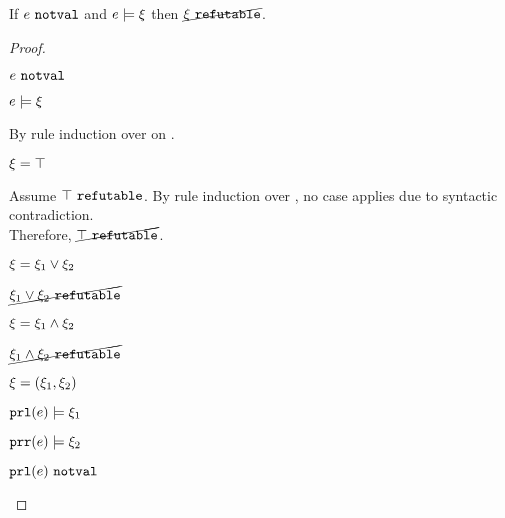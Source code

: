 \begin{lemma}
\label{lem:satisfy-not-refutable}
If $e ~\mathtt{notval}$ and $e \models \xi$ then $\cancel{\xi ~\mathtt{refutable}}$.
\end{lemma}
\begin{proof}
\begin{pfsteps*}
\item $e ~\mathtt{notval}$  
\item $e \models \xi$  
\end{pfsteps*}
By rule induction over  on .
\begin{byCases}
\item[\text{(\ref{rule:CSTruth})}]
    \begin{pfsteps*}
    \item $\xi=\top$ 
    \end{pfsteps*}
    Assume $\top ~\mathtt{refutable}$. By rule induction over , no case applies due to syntactic contradiction.\\
    Therefore, $\cancel{\top ~\mathtt{refutable}}$.
\item[\text{(\ref{rule:CSOr1}),(\ref{rule:CSOr2})}]
    \begin{pfsteps*}
    \item $\xi=\xi_1 \vee \xi_2$ 
    \item $\cancel{\xi_1 \vee \xi_2 ~\mathtt{refutable}}$ 
    \end{pfsteps*}
\item[\text{(\ref{rule:CSAnd})}]
    \begin{pfsteps*}
    \item $\xi=\xi_1 \wedge \xi_2$ 
    \item $\cancel{\xi_1 \wedge \xi_2 ~\mathtt{refutable}}$ 
    \end{pfsteps*}
\item[\text{(\ref{rule:CSNotValPair})}]
    \begin{pfsteps*}
    \item $\xi=(\xi_1 , \xi_2)$ 
    \item $\mathtt{prl}(e) \models \xi_1$  
    \item $\mathtt{prr}(e) \models \xi_2$  
    \item $\mathtt{prl}(e) ~\mathtt{notval}$  

\end{pfsteps*}
\end{byCases}
\end{proof}
